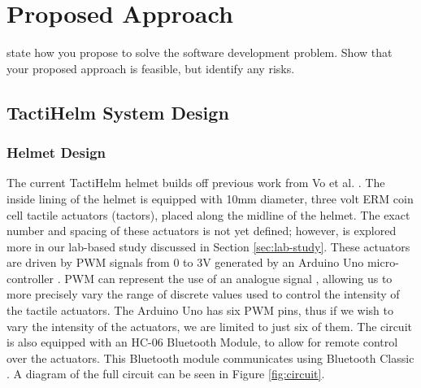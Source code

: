 \documentclass{interim}
\begin{document}
\section{Proposed Approach}

state how you propose to solve the software development problem. Show that your proposed approach is feasible, but identify any risks.

\subsection{TactiHelm System Design}
\subsubsection{Helmet Design}\label{sec:helmet-design}
The current TactiHelm helmet builds off previous work from Vo et al. \cite{10.1145/3411763.3451580}. The inside lining of the helmet is equipped with 10mm diameter, three volt ERM coin cell tactile actuators (tactors), placed along the midline of the helmet. The exact number and spacing of these actuators is not yet defined; however, is explored more in our lab-based study discussed in Section \ref{sec:lab-study}. These actuators are driven by PWM signals from 0 to 3V generated by an Arduino Uno micro-controller \cite{arduinouno}. PWM can represent the use of an analogue signal \cite{kart2001pulse}, allowing us to more precisely vary the range of discrete values used to control the intensity of the tactile actuators. The Arduino Uno has six PWM pins, thus if we wish to vary the intensity of the actuators, we are limited to just six of them. The circuit is also equipped with an HC-06 Bluetooth Module, to allow for remote control over the actuators. This Bluetooth module communicates using Bluetooth Classic \cite{hc06}. A diagram of the full circuit can be seen in Figure \ref{fig:circuit}.
\end{document}
